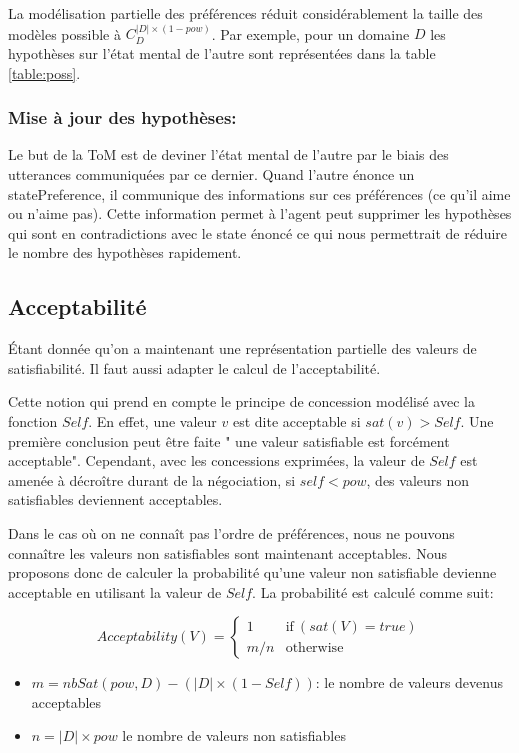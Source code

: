\documentclass{llncs}
\begin{document}
	
	La modélisation partielle des préférences réduit considérablement la taille des modèles possible  à $C_{D}^{|D| \times (1-pow)}$. Par exemple, pour un domaine $D$ les hypothèses sur l'état mental de l'autre sont représentées dans la table \ref{table:poss}.
	
	\subsubsection{Mise à jour des hypothèses:}
		Le but de la ToM est de deviner l'état mental de l'autre par le biais des utterances communiquées par ce dernier. Quand l'autre énonce un statePreference, il communique des informations sur ces préférences (ce qu'il aime ou n'aime pas). Cette information permet à  l'agent peut supprimer les hypothèses qui sont en contradictions avec le state énoncé ce qui nous permettrait de réduire le nombre des hypothèses rapidement.  
	
	
	\subsection{Acceptabilité}
	Étant donnée qu'on a maintenant une représentation partielle des valeurs de satisfiabilité. Il faut aussi adapter le calcul de l'acceptabilité.
	
	Cette notion qui prend en compte le principe de concession modélisé avec la fonction $Self$. En effet, une valeur $v$ est dite acceptable si $sat(v) >Self$. Une première conclusion peut être faite " une valeur satisfiable est forcément acceptable". Cependant, avec les concessions exprimées, la valeur de $Self$ est amenée à décroître durant de la négociation, si $self<pow$, des valeurs non satisfiables deviennent acceptables. 

	Dans le cas où on ne connaît pas l'ordre de préférences, nous ne pouvons connaître les valeurs non satisfiables sont maintenant acceptables. Nous proposons donc de calculer la probabilité qu'une valeur non satisfiable devienne acceptable en utilisant la valeur de $Self$. La probabilité est calculé comme suit:
	
	
	\begin{equation}
	Acceptability(V) =  \left\{\begin{array}{ll}
	1 & \mathrm{if\ } (sat(V) = true)\\
	m/n & \mathrm{otherwise}
	\end{array}\right.
	\end{equation}
	\begin{itemize}
		\item $m= nbSat(pow,D) - (|D| \times (1-Self)) $: le nombre de valeurs devenus acceptables
		\item $n= |D| \times pow $ le nombre de valeurs non satisfiables
	\end{itemize}
	
\end{document}
